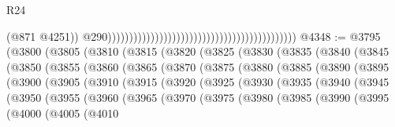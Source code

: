 \begin{lexlean}{R24}
\begin{coremodule}
                                                                                              (@871
                                                                                                @4251))
                                                                                            @290))))))))))))))))))))))))))))))))))))))))))))
@4348 := @3795
    (@3800
      (@3805
        (@3810
          (@3815
            (@3820
              (@3825
                (@3830
                  (@3835
                    (@3840
                      (@3845
                        (@3850
                          (@3855
                            (@3860
                              (@3865
                                (@3870
                                  (@3875
                                    (@3880
                                      (@3885
                                        (@3890
                                          (@3895
                                            (@3900
                                              (@3905
                                                (@3910
                                                  (@3915
                                                    (@3920
                                                      (@3925
                                                        (@3930
                                                          (@3935
                                                            (@3940
                                                              (@3945
                                                                (@3950
                                                                  (@3955
                                                                    (@3960
                                                                      (@3965
                                                                        (@3970
                                                                          (@3975
                                                                            (@3980
                                                                              (@3985
                                                                                (@3990
                                                                                  (@3995
                                                                                    (@4000
                                                                                      (@4005
                                                                                        (@4010

\end{coremodule}
\end{lexlean}

